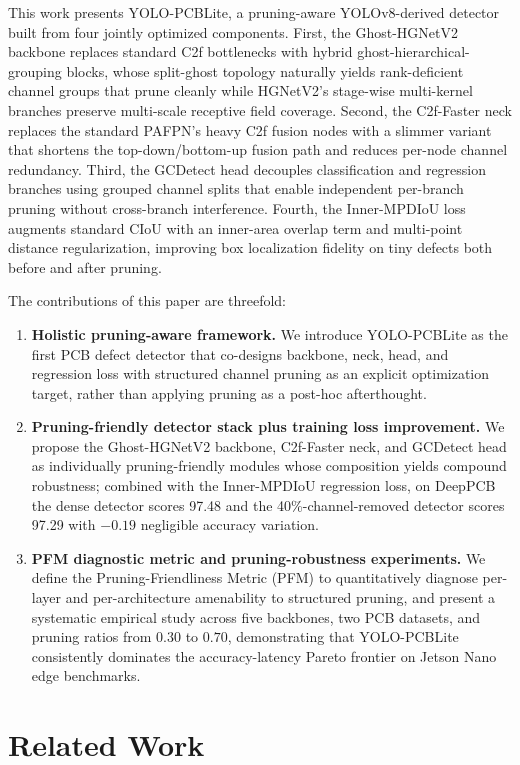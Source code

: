 ﻿\documentclass[conference]{IEEEtran}
\newcommand{\simulated}[1]{#1}
\begin{document}
This work presents YOLO-PCBLite, a pruning-aware YOLOv8-derived detector built from four jointly optimized components. First, the Ghost-HGNetV2 backbone replaces standard C2f bottlenecks with hybrid ghost-hierarchical-grouping blocks, whose split-ghost topology naturally yields rank-deficient channel groups that prune cleanly while HGNetV2's stage-wise multi-kernel branches preserve multi-scale receptive field coverage. Second, the C2f-Faster neck replaces the standard PAFPN's heavy C2f fusion nodes with a slimmer variant that shortens the top-down/bottom-up fusion path and reduces per-node channel redundancy. Third, the GCDetect head decouples classification and regression branches using grouped channel splits that enable independent per-branch pruning without cross-branch interference. Fourth, the Inner-MPDIoU loss augments standard CIoU with an inner-area overlap term and multi-point distance regularization, improving box localization fidelity on tiny defects both before and after pruning.

The contributions of this paper are threefold:
\begin{enumerate}
    \item \textbf{Holistic pruning-aware framework.} We introduce YOLO-PCBLite as the first PCB defect detector that co-designs backbone, neck, head, and regression loss with structured channel pruning as an explicit optimization target, rather than applying pruning as a post-hoc afterthought.
    \item \textbf{Pruning-friendly detector stack plus training loss improvement.} We propose the Ghost-HGNetV2 backbone, C2f-Faster neck, and GCDetect head as individually pruning-friendly modules whose composition yields compound robustness; combined with the Inner-MPDIoU regression loss, on DeepPCB the dense detector scores 97.48 and the 40\%-channel-removed detector scores 97.29 with $-0.19$ negligible accuracy variation.
    \item \textbf{PFM diagnostic metric and pruning-robustness experiments.} We define the Pruning-Friendliness Metric (PFM) to quantitatively diagnose per-layer and per-architecture amenability to structured pruning, and present a systematic empirical study across five backbones, two PCB datasets, and pruning ratios from $\simulated{0.30}$ to $\simulated{0.70}$, demonstrating that YOLO-PCBLite consistently dominates the accuracy-latency Pareto frontier on Jetson Nano edge benchmarks.
\end{enumerate}

\section{Related Work}
\label{sec:related}
\end{document}
